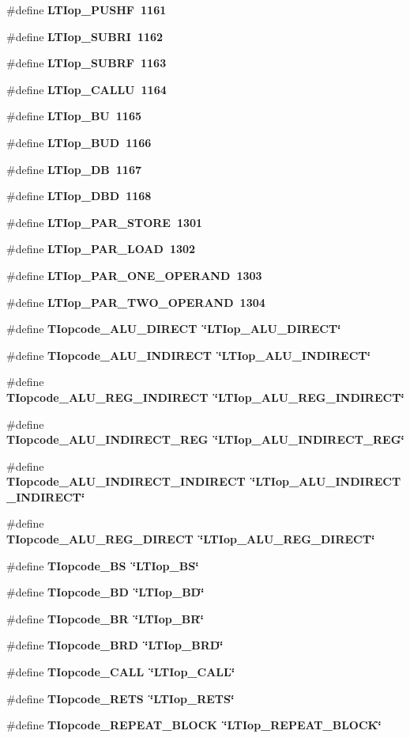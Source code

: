 \begin{CompactItemize}
\#define \bf{LTIop\_\-PUSHF}~1161
\item 
\#define \bf{LTIop\_\-SUBRI}~1162
\item 
\#define \bf{LTIop\_\-SUBRF}~1163
\item 
\#define \bf{LTIop\_\-CALLU}~1164
\item 
\#define \bf{LTIop\_\-BU}~1165
\item 
\#define \bf{LTIop\_\-BUD}~1166
\item 
\#define \bf{LTIop\_\-DB}~1167
\item 
\#define \bf{LTIop\_\-DBD}~1168
\item 
\#define \bf{LTIop\_\-PAR\_\-STORE}~1301
\item 
\#define \bf{LTIop\_\-PAR\_\-LOAD}~1302
\item 
\#define \bf{LTIop\_\-PAR\_\-ONE\_\-OPERAND}~1303
\item 
\#define \bf{LTIop\_\-PAR\_\-TWO\_\-OPERAND}~1304
\item 
\#define \bf{TIopcode\_\-ALU\_\-DIRECT}~\char`\"{}LTIop\_\-ALU\_\-DIRECT\char`\"{}
\item 
\#define \bf{TIopcode\_\-ALU\_\-INDIRECT}~\char`\"{}LTIop\_\-ALU\_\-INDIRECT\char`\"{}
\item 
\#define \bf{TIopcode\_\-ALU\_\-REG\_\-INDIRECT}~\char`\"{}LTIop\_\-ALU\_\-REG\_\-INDIRECT\char`\"{}
\item 
\#define \bf{TIopcode\_\-ALU\_\-INDIRECT\_\-REG}~\char`\"{}LTIop\_\-ALU\_\-INDIRECT\_\-REG\char`\"{}
\item 
\#define \bf{TIopcode\_\-ALU\_\-INDIRECT\_\-INDIRECT}~\char`\"{}LTIop\_\-ALU\_\-INDIRECT\_\-INDIRECT\char`\"{}
\item 
\#define \bf{TIopcode\_\-ALU\_\-REG\_\-DIRECT}~\char`\"{}LTIop\_\-ALU\_\-REG\_\-DIRECT\char`\"{}
\item 
\#define \bf{TIopcode\_\-BS}~\char`\"{}LTIop\_\-BS\char`\"{}
\item 
\#define \bf{TIopcode\_\-BD}~\char`\"{}LTIop\_\-BD\char`\"{}
\item 
\#define \bf{TIopcode\_\-BR}~\char`\"{}LTIop\_\-BR\char`\"{}
\item 
\#define \bf{TIopcode\_\-BRD}~\char`\"{}LTIop\_\-BRD\char`\"{}
\item 
\#define \bf{TIopcode\_\-CALL}~\char`\"{}LTIop\_\-CALL\char`\"{}
\item 
\#define \bf{TIopcode\_\-RETS}~\char`\"{}LTIop\_\-RETS\char`\"{}
\item 
\#define \bf{TIopcode\_\-REPEAT\_\-BLOCK}~\char`\"{}LTIop\_\-REPEAT\_\-BLOCK\char`\"{}

\end{CompactItemize}
